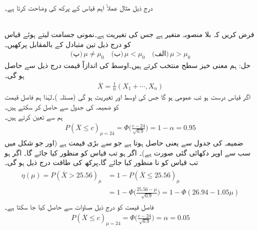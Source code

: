 درج ذیل مثال عملاً اہم قیاس کے پرکھ کی وضاحت کرتا ہے۔ 

\quad {}\\
فرض کریں کہ  بلا منصوبہ متغیر ہے جس کی تغیریت  ہے۔نمونی جسامت  لیتے ہوئے قیاس  کو درج ذیل تین متبادل کے بالمقابل پرکھیں۔
\begin{align*}
\text{(پ)}\, \mu \ne \mu_0 \quad \text{(ب)}\, \mu<\mu_0 \quad \text{(الف)}\,  \mu>\mu_0
\end{align*}
حل:\quad
ہم معنی خیز سطح  منتخب کرتے ہیں۔اوسط کی اندازاً قیمت درج ذیل سے حاصل ہو گی۔
\begin{align*}
\overline{X}=\frac{1}{n}(X_1+\cdots,X_n)
\end{align*}
اگر قیاس درست ہو تب  عمومی ہو گا جس کی اوسط  اور تغیریت  ہو گی (مسئلہ )۔لہٰذا ہم فاصل قیمت  کو ضمیمہ  کی جدول  سے حاصل کر سکتے ہیں۔\\
\quad
ہم  سے  تعین کرتے ہیں۔
\begin{align*}
P(\overline{X}\le c)_{\mu=24}=\Phi\big(\frac{c-24}{\sqrt{0.9}}\big)=1-\alpha=0.95
\end{align*}
ضمیمہ  کی جدول   سے  یعنی  حاصل ہوتا ہے جو  سے بڑی قیمت ہے (اور جو شکل  میں سب سے اوپر دکھائی گئی صورت ہے)۔ اگر  ہو تب قیاس کو منظور کیا جائے گا۔ اگر  ہو تب قیاس کو نا منظور کیا جائے گا۔پرکھ کی طاقت درج ذیل ہو گی۔
\begin{gather}
\begin{aligned}
\eta(\mu)=P(\overline{X}>25.56)_{\mu}&=1-P(\overline{X}\le 25.56)_{\mu}\\
&=1-\Phi\big(\frac{25.56-\mu}{\sqrt{0.9}}\big)=1-\Phi(26.94-1.05\mu)
\end{aligned}
\end{gather}
\quad
فاصل قیمت  کو درج ذیل مساوات سے حاصل کیا جا سکتا ہے۔
\begin{align*}
P(\overline{X}\le c)_{\mu=24}=\Phi\big(\frac{c-24}{\sqrt{0.9}}\big)=\alpha=0.05
\end{align*}
